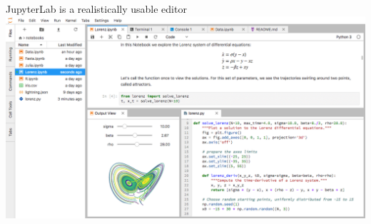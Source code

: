 \documentclass[aspectratio=169]{beamer}
\begin{document}
\begin{frame}{JupyterLab is a realistically usable editor}
\vspace{0.35 cm}
\includegraphics[width=0.95\linewidth]{jupyterlab.png}
\end{frame}
\end{document}

